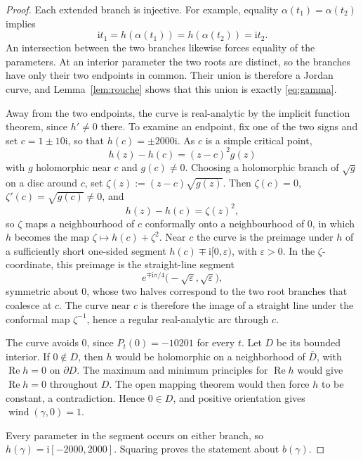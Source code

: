 \documentclass[11pt,a4paper]{amsart}
\theoremstyle{remark}
\numberwithin{equation}{section}
\newcommand{\ii}{\mathrm i}
\DeclareMathOperator{\wind}{wind}
\DeclareMathOperator{\Rea}{Re}
\begin{document}
\begin{proof}
Each extended branch is injective. For example, equality \(\alpha(t_1)=\alpha(t_2)\) implies
\[
 \ii t_1=h(\alpha(t_1))=h(\alpha(t_2))=\ii t_2.
\]
An intersection between the two branches likewise forces equality of the parameters. At an interior parameter the two roots are distinct, so the branches have only their two endpoints in common. Their union is therefore a Jordan curve, and Lemma~\ref{lem:rouche} shows that this union is exactly \eqref{eq:gamma}.

Away from the two endpoints, the curve is real-analytic by the implicit
function theorem, since $h'\neq0$ there. To examine an endpoint, fix one of the two signs and set $c = 1\pm10\ii$, so that $h(c) = \pm 2000\ii$. As $c$ is a simple critical point,
\[
  h(z)-h(c )=(z-c)^2 g(z)
\]
with $g$ holomorphic near $c$ and $g(c)\neq0$. Choosing a holomorphic branch
of $\sqrt{g}$ on a disc around $c$, set $\zeta(z):=(z-c)\sqrt{g(z)}$. Then
$\zeta(c)=0$, $\zeta'(c)=\sqrt{g(c)}\neq0$, and
\[
  h(z)-h(c)=\zeta(z)^2 ,
\]
so $\zeta$ maps a neighbourhood of $c$ conformally \cite[Corollary 2]{ahlfors1979complex} onto a neighbourhood of
$0$, in which $h$ becomes the map $\zeta\mapsto h(c)+\zeta^2$. Near $c$ the curve is the preimage under $h$ of a sufficiently short one-sided segment $h(c)\mp \ii [0,\varepsilon)$, with $\varepsilon>0$.
In the \(\zeta\)-coordinate, this preimage is the straight-line segment
\[
    e^{\mp\mathrm i\pi/4} \bigl(-\sqrt{\varepsilon},\sqrt{\varepsilon}\bigr),
\]
symmetric about $0$, whose two halves correspond to the two root branches that coalesce at $c$.
The curve near $c$ is therefore the image of a
straight line under the conformal map $\zeta^{-1}$, hence a regular
real-analytic arc through $c$.



The curve avoids \(0\), since \(P_t(0)=-10201\) for every \(t\). Let \(D\) be its bounded interior. If \(0\notin D\), then \(h\) would be holomorphic on a neighborhood of \(\overline D\), with \(\Rea h=0\) on \(\partial D\). The maximum and minimum principles for \(\Rea h\) would give \(\Rea h=0\) throughout \(D\). The open mapping theorem would then force \(h\) to be constant, a contradiction. Hence \(0\in D\), and positive orientation gives \(\wind(\gamma,0)=1\).

Every parameter in the segment occurs on either branch, so \(h(\gamma)=\ii[-2000,2000]\). Squaring proves the statement about \(b(\gamma)\).
\end{proof}
\end{document}
